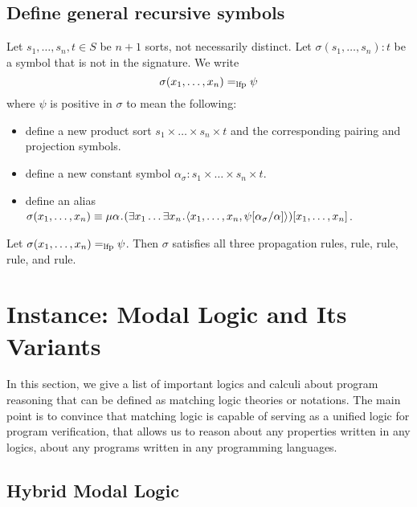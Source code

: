 \documentclass{amsart}
\begin{document}
\subsection{Define general recursive symbols}

\begin{definition}
Let $s_1,\dots,s_n,t \in S$ be $n+1$ sorts, not necessarily distinct.
Let $\sigma (s_1,\dots,s_n) {:} t$ be a symbol that is not in the signature.
We write
$$
\sigma(x_1,\dots,x_n) =_{\mathrm{lfp}} \psi
$$
where $\psi$ is positive in $\sigma$
to mean the following:
\begin{itemize}
\item define a new product sort $s_1 \times \dots \times s_n \times t$
      and the corresponding pairing and projection symbols.
\item define a new constant symbol $\alpha_\sigma : s_1 \times \dots \times 
s_n \times t$.
\item define an alias $\sigma(x_1,\dots,x_n) \equiv \mu \alpha \mathbin{\!.\!}
(\exists x_1 \dots \exists x_n \mathbin{\!.\!}
\langle x_1 , \dots , x_n ,
\psi[\alpha_\sigma / \alpha]
\rangle)
[x_1,\dots,x_n]
$.
\end{itemize}
\end{definition}

\begin{proposition}
Let $\sigma(x_1,\dots,x_n) =_{\mathrm{lfp}} \psi$.
Then $\sigma$ satisfies all three propagation rules,
 rule,  rule,
 rule, and  rule.
\end{proposition}

\section{Instance: Modal Logic and Its Variants}

In this section, we give a list of important logics and calculi about
program reasoning that can be defined as matching logic theories or notations.
The main point is to convince that matching logic is capable of
serving as a unified logic for program verification,
that allows us to reason about any properties written in any logics,
about any programs written in any programming languages.

\subsection{Hybrid Modal Logic}
\label{sec_hybrid_modal_logic}
\end{document}
